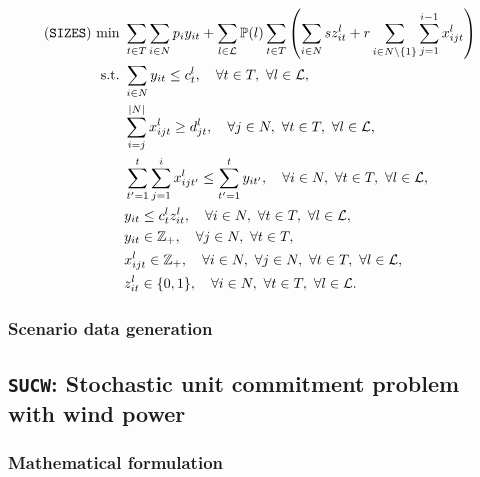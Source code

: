\begin{subequations}
	\begin{align}
	(\texttt{SIZES})\ \textrm{min}\ &\sum_{t\in T}\sum_{i\in N} p_i y_{it} + \sum_{l\in \mathcal{L}} \PP(l)\sum_{t\in T}\left(\sum_{i\in N} sz_{it}^l+r\sum_{i\in N\backslash\{1\}}\sum_{j=1}^{i-1}x_{ijt}^l\right) \\
	\textrm{s.t.}\ &\sum_{i\in N}y_{it}\le c_{t}^l,\quad \forall t\in T,\ \forall l\in \mathcal{L}, \\
	&\sum_{i=j}^{|N|} x_{ijt}^l \ge d_{jt}^l,\quad\forall j\in N,\ \forall t\in T,\  \forall l\in \mathcal{L},\\
	&\sum_{t'=1}^{t}\sum_{j=1}^{i}x_{ijt'}^l\le\sum_{t'=1}^{t}y_{it'}, \quad\forall i\in N,\ \forall t\in T,\ \forall l\in \mathcal{L},\\
	&y_{it}\le c_{t}^l z_{it}^l,\quad\forall i \in N,\ \forall t\in T,\ \forall l\in \mathcal{L},\\
	&y_{it}\in\mathbb{Z}_+,\quad \forall j\in N,\ \forall t\in T,\\
	&x_{ijt}^l\in\mathbb{Z}_+,\quad\forall i\in N,\ \forall j\in N,\ \forall t\in T,\ \forall l\in \mathcal{L},\\
	&z_{it}^l\in\{0,1\},\quad\forall i\in N,\ \forall t\in T,\ \forall l\in \mathcal{L}.
	\end{align}
\end{subequations}

\subsubsection{Scenario data generation}



\subsection{\texttt{SUCW}: Stochastic unit commitment problem with wind power}

\subsubsection{Mathematical formulation}


